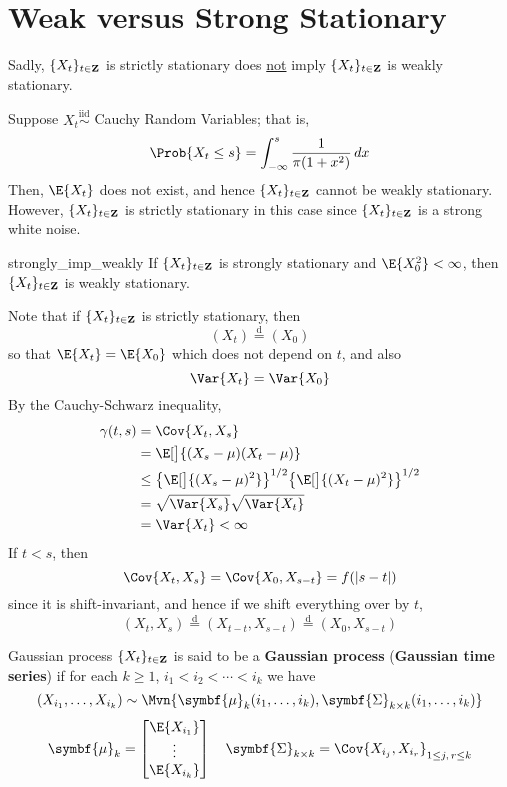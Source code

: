 \section{Weak versus Strong Stationary}
Sadly, $ \{X_t\}_{t\in\mathbf{Z}} $ is strictly stationary does \underline{not} imply
$ \{X_t\}_{t\in\mathbf{Z}} $ is weakly stationary.
\begin{Example}{}{}
    Suppose $ X_t\stackrel{\text{iid}}{\sim} $ Cauchy Random Variables;
    that is,
    \[ \Prob{X_t\le s}=\int_{-\infty}^{s} \frac{1}{\pi(1+x^2)}\, d{x}  \]
    Then, $ \E{X_t} $ does not exist, and hence $ \{X_t\}_{t\in\mathbf{Z}} $ cannot
    be weakly stationary. However, $ \{X_t\}_{t\in\mathbf{Z}} $ is strictly
    stationary in this case since $ \{X_t\}_{t\in\mathbf{Z}} $ is a strong
    white noise.
\end{Example}
\begin{Theorem}{}{strongly_imp_weakly}
    If $ \{X_t\}_{t\in\mathbf{Z}} $ is strongly stationary and $ \E{X_0^2}<\infty $,
    then $ \{X_t\}_{t\in\mathbf{Z}} $ is weakly stationary.
\end{Theorem}
\begin{Proof}{}{}
    Note that if $ \{X_t\}_{t\in\mathbf{Z}} $ is strictly stationary, then
    \[ (X_t)\stackrel{\text{d}}{=}(X_0) \]
    so that $ \E{X_t}=\E{X_0} $ which does not depend on $ t $, and also
    \[ \Var{X_t}=\Var{X_0} \]
    By the Cauchy-Schwarz inequality,
    \begin{align*}
        \gamma(t,s)
         & =\Cov{X_t,X_s}                                                           \\
         & =\E[\big]{(X_s-\mu)(X_t-\mu)}                                            \\
         & \le \set*{\E[\big]{(X_s-\mu)^2}}^{1/2}\set*{\E[\big]{(X_t-\mu)^2}}^{1/2} \\
         & =\sqrt{\Var{X_s}}\sqrt{\Var{X_t}}                                        \\
         & =\Var{X_t}<\infty
    \end{align*}
    If $ t<s $, then
    \[ \Cov{X_t,X_s}=\Cov{X_0,X_{s-t}}=f(\abs{s-t}) \]
    since it is shift-invariant, and hence if we shift everything over by $ t $,
    \[ (X_t,X_s)\stackrel{\text{d}}{=}(X_{t-t},X_{s-t})\stackrel{\text{d}}{=}(X_0,X_{s-t}) \]
\end{Proof}
\begin{Definition}{Gaussian process}{}
    $ \{X_t\}_{t\in\mathbf{Z}} $ is said to be a
    \textbf{Gaussian process} (\textbf{Gaussian time series}) if
    for each $ k\ge 1 $, $ i_1<i_2<\cdots<i_k $ we have
    \[ (X_{i_1},\ldots,X_{i_k})\sim
        \Mvn{\symbf{\mu}_k(i_1,\ldots,i_k),\symbf{\Sigma}_{k\times k}(i_1,\ldots,i_k)} \]
    \[ \symbf{\mu}_k=\begin{bmatrix}
            \E{X_{i_1}} \\
            \vdots      \\
            \E{X_{i_k}}
        \end{bmatrix}\quad
        \symbf{\Sigma}_{k\times k}=
        \Cov{X_{i_j},X_{i_r}}_{1\le j,\, r\le k} \]
\end{Definition}
